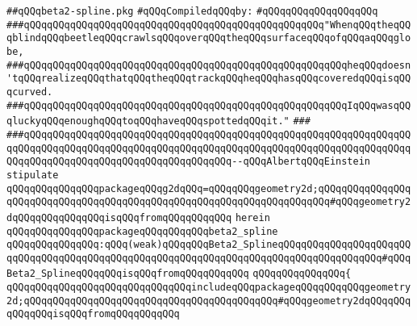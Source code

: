 \label{src/lib/x-kit/draw/beta2-spline.pkg}
\verb|##qQQqbeta2-spline.pkg|\newline
\newline
\verb|#qQQqCompiledqQQqby:|\newline
\verb|#qQQqqQQqqQQqqQQqqQQq|\newline
\newline
\verb|###qQQqqQQqqQQqqQQqqQQqqQQqqQQqqQQqqQQqqQQqqQQqqQQqqQQq"WhenqQQqtheqQQqblindqQQqbeetleqQQqcrawlsqQQqoverqQQqtheqQQqsurfaceqQQqofqQQqaqQQqglobe,|\newline
\verb|###qQQqqQQqqQQqqQQqqQQqqQQqqQQqqQQqqQQqqQQqqQQqqQQqqQQqqQQqheqQQqdoesn'tqQQqrealizeqQQqthatqQQqtheqQQqtrackqQQqheqQQqhasqQQqcoveredqQQqisqQQqcurved.|\newline
\verb|###qQQqqQQqqQQqqQQqqQQqqQQqqQQqqQQqqQQqqQQqqQQqqQQqqQQqqQQqIqQQqwasqQQqluckyqQQqenoughqQQqtoqQQqhaveqQQqspottedqQQqit."|\newline
\verb|###|\newline
\verb|###qQQqqQQqqQQqqQQqqQQqqQQqqQQqqQQqqQQqqQQqqQQqqQQqqQQqqQQqqQQqqQQqqQQqqQQqqQQqqQQqqQQqqQQqqQQqqQQqqQQqqQQqqQQqqQQqqQQqqQQqqQQqqQQqqQQqqQQqqQQqqQQqqQQqqQQqqQQqqQQqqQQqqQQqqQQqqQQq--qQQqAlbertqQQqEinstein|\newline
\newline
\newline
\verb|stipulate|\newline
\verb|qQQqqQQqqQQqqQQqpackageqQQqg2dqQQq=qQQqqQQqgeometry2d;qQQqqQQqqQQqqQQqqQQqqQQqqQQqqQQqqQQqqQQqqQQqqQQqqQQqqQQqqQQqqQQqqQQqqQQq#qQQqgeometry2dqQQqqQQqqQQqqQQqisqQQqfromqQQqqQQqqQQq|\newline
\verb|herein|\newline
\newline
\verb|qQQqqQQqqQQqqQQqpackageqQQqqQQqqQQqbeta2_spline|\newline
\verb|qQQqqQQqqQQqqQQq:qQQq(weak)qQQqqQQqBeta2_SplineqQQqqQQqqQQqqQQqqQQqqQQqqQQqqQQqqQQqqQQqqQQqqQQqqQQqqQQqqQQqqQQqqQQqqQQqqQQqqQQqqQQqqQQq#qQQqBeta2_SplineqQQqqQQqisqQQqfromqQQqqQQqqQQq|\newline
\verb|qQQqqQQqqQQqqQQq{|\newline
\verb|qQQqqQQqqQQqqQQqqQQqqQQqqQQqqQQqincludeqQQqpackageqQQqqQQqqQQqgeometry2d;qQQqqQQqqQQqqQQqqQQqqQQqqQQqqQQqqQQqqQQqqQQq#qQQqgeometry2dqQQqqQQqqQQqqQQqisqQQqfromqQQqqQQqqQQq|\newline
